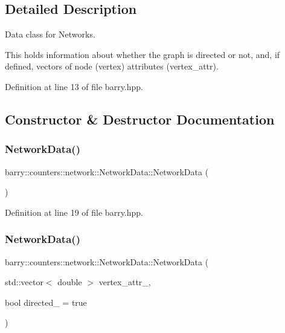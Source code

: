 \subsection{Detailed Description}
Data class for Networks. 

This holds information about whether the graph is directed or not, and, if defined, vectors of node (vertex) attributes ({\ttfamily vertex\+\_\+attr}). 

Definition at line 13 of file barry.\+hpp.



\subsection{Constructor \& Destructor Documentation}
\mbox{\label{classbarry_1_1counters_1_1network_1_1_network_data_a285d956b719012c5296aa537aca17fb2}} 
\subsubsection{\texorpdfstring{Network\+Data()}{NetworkData()}\hspace{0.1cm}{\footnotesize\ttfamily [1/3]}}
{\footnotesize\ttfamily barry\+::counters\+::network\+::\+Network\+Data\+::\+Network\+Data (\begin{DoxyParamCaption}{ }\end{DoxyParamCaption})\hspace{0.3cm}{\ttfamily [inline]}}



Definition at line 19 of file barry.\+hpp.

\mbox{\label{classbarry_1_1counters_1_1network_1_1_network_data_a6db461d607e95bc04dfb527f3422142d}} 
\subsubsection{\texorpdfstring{Network\+Data()}{NetworkData()}\hspace{0.1cm}{\footnotesize\ttfamily [2/3]}}
{\footnotesize\ttfamily barry\+::counters\+::network\+::\+Network\+Data\+::\+Network\+Data (\begin{DoxyParamCaption}\item[{std\+::vector$<$ double $>$}]{vertex\+\_\+attr\+\_\+,  }\item[{bool}]{directed\+\_\+ = {\ttfamily true} }\end{DoxyParamCaption})\hspace{0.3cm}{\ttfamily [inline]}}



